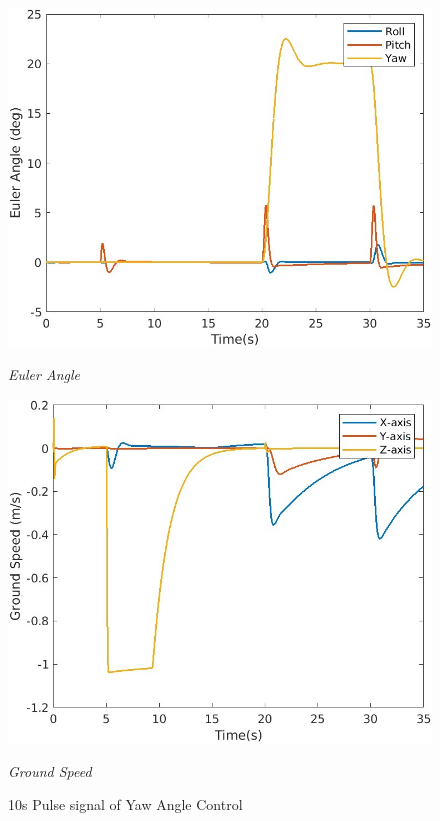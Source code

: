 \begin{figure}[htbp]
  \centering
  \begin{minipage}[b]{0.45\textwidth}
    \centering
    \includegraphics[width=\textwidth]{Images/Attitude Control Plot/1 EulerAngle1.jpg}
    \caption*{\textit{Euler Angle}}
  \end{minipage}
  \hfil
  \begin{minipage}[b]{0.45\textwidth}
    \centering
    \includegraphics[width=\textwidth]{Images/Attitude Control Plot/2 groundspeed_1.jpg}
    \caption*{\textit{Ground Speed}}
  \end{minipage}
  \caption{10s Pulse signal of Yaw Angle Control}
  \label{fig:attitude control yaw}
\end{figure}
